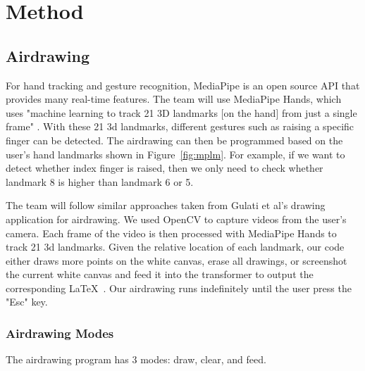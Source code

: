 \section{Method}
\label{sec:method}

\subsection{Airdrawing}
For hand tracking and gesture recognition, MediaPipe is an open source API that provides many real-time features. The team will use MediaPipe Hands, which uses "machine learning to track 21 3D landmarks [on the hand] from just a single frame" \cite{MP}. With these 21 3d landmarks, different gestures such as raising a specific finger can be detected. The airdrawing can then be programmed based on the user's hand landmarks shown in Figure~\ref{fig:mplm}. For example, if we want to detect whether index finger is raised, then we only need to check whether landmark 8 is higher than landmark 6 or 5. 



The team will follow similar approaches taken from Gulati et al's drawing application \cite{MPDrawing} for airdrawing. We used OpenCV to capture videos from the user's camera. Each frame of the video is then processed with MediaPipe Hands to track 21 3d landmarks. Given the relative location of each landmark, our code either draws more points on the white canvas, erase all drawings, or screenshot the current white canvas and feed it into the transformer to output the corresponding \LaTeX\ . Our airdrawing runs indefinitely until the user press the "Esc" key. 

\subsubsection{Airdrawing Modes} \label{sec:drawingmodes}
The airdrawing program has 3 modes: draw, clear, and feed. 

